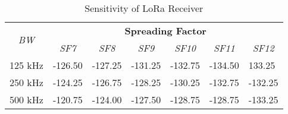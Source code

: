 \begin{table}[h]
    \caption{Sensitivity of LoRa Receiver}
    \label{tab:spreading}
    \centering
    \begin{adjustbox}{max width=0.7\textwidth,center}
    \begin{tabular}{|l|llllll|}
    \hline
    \multicolumn{1}{|c|}{\multirow{2}{*}{\textit{BW}}} & \multicolumn{6}{c|}{\textbf{Spreading Factor}}                                                                                                                                                                           \\ \cline{2-7} 
    \multicolumn{1}{|c|}{}                             & \multicolumn{1}{c|}{\textit{SF7}} & \multicolumn{1}{c|}{\textit{SF8}} & \multicolumn{1}{c|}{\textit{SF9}} & \multicolumn{1}{c|}{\textit{SF10}} & \multicolumn{1}{c|}{\textit{SF11}} & \multicolumn{1}{c|}{\textit{SF12}} \\ \hline
    125 kHz                                            & \multicolumn{1}{l|}{-126.50}      & \multicolumn{1}{l|}{-127.25}      & \multicolumn{1}{l|}{-131.25}      & \multicolumn{1}{l|}{-132.75}       & \multicolumn{1}{l|}{-134.50}       & 133.25                             \\ \hline
    250 kHz                                            & \multicolumn{1}{l|}{-124.25}      & \multicolumn{1}{l|}{-126.75}      & \multicolumn{1}{l|}{-128.25}      & \multicolumn{1}{l|}{-130.25}       & \multicolumn{1}{l|}{-132.75}       & -132.25                            \\ \hline
    500 kHz                                            & \multicolumn{1}{l|}{-120.75}      & \multicolumn{1}{l|}{-124.00}      & \multicolumn{1}{l|}{-127.50}      & \multicolumn{1}{l|}{-128.75}       & \multicolumn{1}{l|}{-128.75}       & -133.25                            \\ \hline
    \end{tabular}
    \end{adjustbox}
\end{table}   